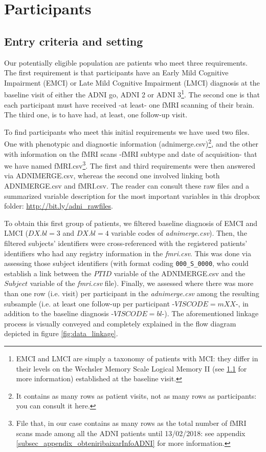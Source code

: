 \documentclass[a4paper,12pt]{elsarticle}  %
\begin{document}
	

	



\section{Participants}
	\subsection{Entry criteria and setting} \label{entry_criteria_and_setting}
	Our potentially eligible population are patients who meet three requirements. The first requirement is that participants have an Early Mild Cognitive Impairment (EMCI) or Late Mild Cognitive Impairment (LMCI) diagnosis at the baseline visit of either the ADNI go, ADNI 2 or ADNI 3\footnote{EMCI and LMCI are simply a taxonomy of patients with MCI: they differ in their levels on the Wechsler Memory Scale Logical Memory II (see \ref{entry_criteria_and_setting} for more information) established at the baseline visit.}. The second one is that each participant must have received -at least- one fMRI scanning of their brain. The third one, is to have had, at least, one follow-up visit.
	
	To find participants who meet this initial requirements we have used two files. One with phenotypic and diagnostic information (adnimerge.csv)\footnote{It contains as many rows as patient visits, not as many rows as participants: you can consult it here.}, and the other with information on the fMRI scans -fMRI subtype and date of acquisition- that we have named fMRI.csv\footnote{File that, in our case contains as many rows as the total number of fMRI scans made among all the ADNI patients until 13/02/2018: see appendix \ref{subsec_appendix_obteniribaixarInfoADNI} for more information.}. The first and third requirements were then answered via ADNIMERGE.csv, whereas the second one involved linking both ADNIMERGE.csv and fMRI.csv. The reader can consult these raw files and a summarized variable description for the most important variables in this dropbox folder: \href{http://bit.ly/adni_rawfiles}{http://bit.ly/adni\_rawfiles}.
	
	To obtain this first group of patients, we filtered baseline diagnosis of EMCI and LMCI ($DX.bl=3$ and $DX.bl=4$ variable codes of \textit{adnimerge.csv}). Then, the filtered subjects' identifiers were cross-referenced with the registered patients' identifiers who had any registry information in the \textit{fmri.csv}. This was done via assessing those subject identifiers (with format coding \texttt{000\_S\_0000}, who could establish a link between the $PTID$ variable of the ADNIMERGE.csv and the $Subject$ variable of the \textit{fmri.csv} file). Finally, we assessed where there was more than one row (i.e. visit) per participant in the \textit{adnimerge.csv} among the resulting subsample (i.e. at least one follow-up per participant  -$VISCODE=mXX$-, in addition to the baseline diagnosis -$VISCODE=bl$-). The aforementioned linkage process is visually conveyed and completely explained in the flow diagram depicted in figure \ref{fig:data_linkage}. 
	
\end{document}
